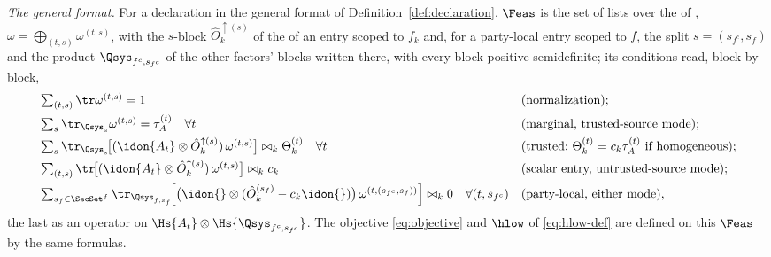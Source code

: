 \begin{definition}
\emph{The general format.} For a declaration in the general format of
Definition~\ref{def:declaration}, $\Feas$ is the set of lists over the
 of ,
$\omega=\bigoplus_{(t,s)}\omega^{(t,s)}$, with the $s$-block
$\hat O^{\uparrow(s)}_k$ of the  of an entry scoped to $f_k$
and, for a party-local entry scoped to $f$, the split $s=(s_{f^c},s_f)$ and
the product $\Qsys_{f^c,s_{f^c}}$ of the other factors' blocks written
there, with every block positive semidefinite; its conditions read, block by
block,
\begin{equation}\label{eq:feas-general}
\begin{aligned}
  &\textstyle\sum_{(t,s)}\tr\omega^{(t,s)}=1
  &&\text{(normalization)};\\
  &\textstyle\sum_{s}\tr_{\Qsys_s}\omega^{(t,s)}=\tau^{(t)}_A
  \quad\forall t
  &&\text{(marginal, trusted-source mode)};\\
  &\textstyle\sum_{s}\tr_{\Qsys_s}\!\big[(\idon{A_t}\otimes
  \hat O^{\uparrow(s)}_k)\,\omega^{(t,s)}\big]\bowtie_k\Theta^{(t)}_k
  \quad\forall t
  &&\text{(trusted; }\Theta^{(t)}_k=c_k\tau^{(t)}_A
  \text{ if homogeneous)};\\
  &\textstyle\sum_{(t,s)}\tr\!\big[(\idon{A_t}\otimes
  \hat O^{\uparrow(s)}_k)\,\omega^{(t,s)}\big]\bowtie_kc_k
  &&\text{(scalar entry, untrusted-source mode)};\\
  &\textstyle\sum_{s_f\in\SecSet^{f}}\tr_{\Qsys_{f,s_f}}\!\Big[\big(\idon{}
  \otimes(\hat O^{(s_f)}_k-c_k\idon{})\big)\,
  \omega^{(t,(s_{f^c},s_f))}\Big]\bowtie_k0
  \quad\forall(t,s_{f^c})
  &&\text{(party-local, either mode)},
\end{aligned}
\end{equation}
the last as an operator on $\Hs{A_t}\otimes\Hs{\Qsys_{f^c,s_{f^c}}}$. The
objective \eqref{eq:objective} and $\hlow$ of \eqref{eq:hlow-def} are
defined on this $\Feas$ by the same formulas.
\end{definition}
